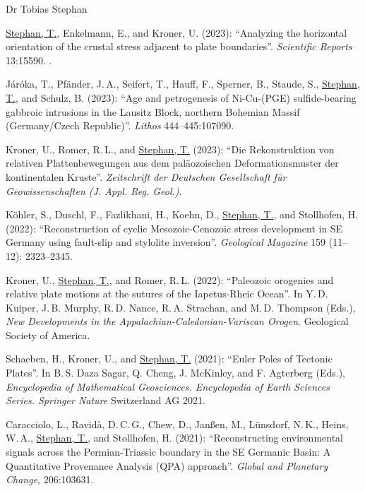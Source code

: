 \documentclass[10pt, paper=letter]{scrartcl} %
\begin{document}
\begin{cv}{\textcolor{myred}{\textsf{Dr Tobias Stephan}}}
\begin{cvlist}{}
        \item[12] \ul{Stephan, T.}, Enkelmann, E., and Kroner, U. (2023): \enquote{Analyzing the horizontal orientation of the crustal stress adjacent to plate boundaries}. \textit{Scientific Reports} 13:15590. .
        \item[11] Járóka, T.,  Pfänder, J.\,A., Seifert, T., Hauff, F., Sperner, B., Staude, S., \ul{Stephan, T.}, and Schulz, B. (2023): \enquote{Age and petrogenesis of Ni-Cu-(PGE) sulfide-bearing gabbroic intrusions in the Lausitz Block, northern Bohemian Massif (Germany/Czech Republic)}. \textit{Lithos} 444--445:107090. 
        \item[10] Kroner, U., Romer, R.\,L., and \ul{Stephan, T.} (2023): \enquote{Die Rekonstruktion von relativen Plattenbewegungen aus dem paläozoischen Deformationsmuster der kontinentalen Kruste}. \textit{Zeitschrift der Deutschen Gesellschaft für Geowissenschaften (J. Appl. Reg. Geol.)}. 
        \item[9] K\"ohler, S., Duschl, F., Fazlikhani, H., Koehn, D., \ul{Stephan, T.}, and Stollhofen, H. (2022): \enquote{Reconstruction of cyclic Mesozoic-Cenozoic stress development in SE Germany using fault-slip and stylolite inversion}. \textit{Geological Magazine} 159 (11--12): 2323--2345. 
        \item[8] Kroner, U., \ul{Stephan, T.}, and Romer, R.\,L. (2022): \enquote{Paleozoic orogenies and relative plate motions at the sutures of the Iapetus-Rheic Ocean}. In Y.\,D. Kuiper, J.\,B. Murphy, R.\,D. Nance, R.\,A. Strachan, and M.\,D. Thompson (Eds.), \textit{New Developments in the Appalachian-Caledonian-Variscan Orogen}. Geological Society of America. 
        \item[7] Schaeben, H., Kroner, U., and \ul{Stephan, T.} (2021): \enquote{Euler Poles of Tectonic Plates}. In B.\,S. Daza Sagar, Q. Cheng, J. McKinley, and F. Agterberg (Eds.), \textit{Encyclopedia of Mathematical Geosciences. Encyclopedia of Earth Sciences Series. Springer Nature} Switzerland AG 2021. 
        \item[6] Caracciolo, L., Ravid\`a, D.\,C.\,G., Chew, D., Jan{\ss}en, M., L\"unsdorf, N.\,K., Heins, W.\,A., \ul{Stephan, T.}, and Stollhofen, H. (2021): \enquote{Reconstructing environmental signals across the Permian-Triassic boundary in the SE Germanic Basin: A Quantitative Provenance Analysis (QPA) approach}. \textit{Global and Planetary Change}, 206:103631.  

\end{cvlist}
\end{cv}
\end{document}
